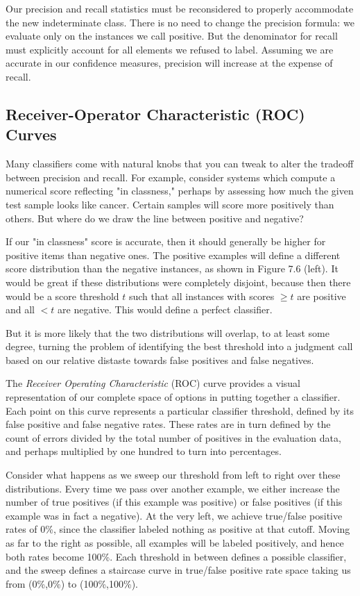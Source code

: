 \documentclass[10pt]{article}
\begin{document}
Our precision and recall statistics must be reconsidered to properly accommodate the new indeterminate class. There is no need to change the precision formula: we evaluate only on the instances we call positive. But the denominator for recall must explicitly account for all elements we refused to label. Assuming we are accurate in our confidence measures, precision will increase at the expense of recall.

\subsection{Receiver-Operator Characteristic (ROC) Curves}
Many classifiers come with natural knobs that you can tweak to alter the tradeoff between precision and recall. For example, consider systems which compute a numerical score reflecting "in classness," perhaps by assessing how much the given test sample looks like cancer. Certain samples will score more positively than others. But where do we draw the line between positive and negative?

If our "in classness" score is accurate, then it should generally be higher for positive items than negative ones. The positive examples will define a different score distribution than the negative instances, as shown in Figure 7.6 (left). It would be great if these distributions were completely disjoint, because then there would be a score threshold \(t\) such that all instances with scores \(\geq t\) are positive and all \(< t\) are negative. This would define a perfect classifier.

But it is more likely that the two distributions will overlap, to at least some degree, turning the problem of identifying the best threshold into a judgment call based on our relative distaste towards false positives and false negatives.

The \textit{Receiver Operating Characteristic} (ROC) curve provides a visual representation of our complete space of options in putting together a classifier. Each point on this curve represents a particular classifier threshold, defined by its false positive and false negative rates. These rates are in turn defined by the count of errors divided by the total number of positives in the evaluation data, and perhaps multiplied by one hundred to turn into percentages.

Consider what happens as we sweep our threshold from left to right over these distributions. Every time we pass over another example, we either increase the number of true positives (if this example was positive) or false positives (if this example was in fact a negative). At the very left, we achieve true/false positive rates of 0\%, since the classifier labeled nothing as positive at that cutoff. Moving as far to the right as possible, all examples will be labeled positively, and hence both rates become 100\%. Each threshold in between defines a possible classifier, and the sweep defines a staircase curve in true/false positive rate space taking us from (0\%,0\%) to (100\%,100\%).
\end{document}
